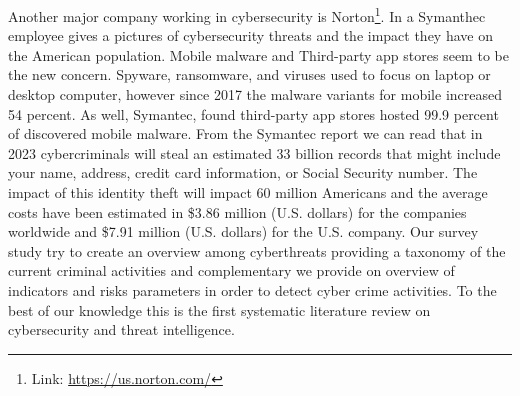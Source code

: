 Another major company working in cybersecurity is Norton\footnote{Link: \href{}{https://us.norton.com/}}. In \cite{norton} a Symanthec employee gives a pictures of cybersecurity threats and the impact they have on the American population. Mobile malware and Third-party app stores seem to be the new concern. Spyware, ransomware, and viruses used to focus on laptop or desktop computer, however since 2017 the malware variants for mobile increased 54 percent. As well, Symantec, found third-party app stores hosted 99.9 percent of discovered mobile malware. From the Symantec report we can read that in 2023 cybercriminals will steal an estimated 33 billion records that might include your name, address, credit card information, or Social Security number. The impact of this identity theft will impact 60 million Americans and the average costs have been estimated in \$3.86 million (U.S. dollars) for the companies worldwide and \$7.91 million (U.S. dollars) for the U.S. company.
Our survey study try to create an overview among cyberthreats providing a taxonomy of the current criminal activities and complementary we provide on overview of indicators and risks parameters in order to detect cyber crime activities. To the best of our knowledge this is the first systematic literature review on cybersecurity and threat intelligence.

